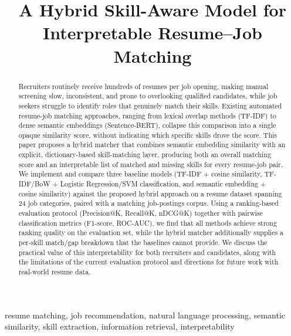 \documentclass[conference]{IEEEtran}
\begin{document}
\title{A Hybrid Skill-Aware Model for Interpretable Resume--Job Matching}

\author{
}

\maketitle

\begin{abstract}
Recruiters routinely receive hundreds of resumes per job opening, making manual screening slow, inconsistent, and prone to overlooking qualified candidates, while job seekers struggle to identify roles that genuinely match their skills. Existing automated resume-job matching approaches, ranging from lexical overlap methods (TF-IDF) to dense semantic embeddings (Sentence-BERT), collapse this comparison into a single opaque similarity score, without indicating which specific skills drove the score. This paper proposes a hybrid matcher that combines semantic embedding similarity with an explicit, dictionary-based skill-matching layer, producing both an overall matching score and an interpretable list of matched and missing skills for every resume-job pair. We implement and compare three baseline models (TF-IDF + cosine similarity, TF-IDF/BoW + Logistic Regression/SVM classification, and semantic embedding + cosine similarity) against the proposed hybrid approach on a resume dataset spanning 24 job categories, paired with a matching job-postings corpus. Using a ranking-based evaluation protocol (Precision@K, Recall@K, nDCG@K) together with pairwise classification metrics (F1-score, ROC-AUC), we find that all methods achieve strong ranking quality on the evaluation set, while the hybrid matcher additionally supplies a per-skill match/gap breakdown that the baselines cannot provide. We discuss the practical value of this interpretability for both recruiters and candidates, along with the limitations of the current evaluation protocol and directions for future work with real-world resume data.
\end{abstract}

\begin{IEEEkeywords}
resume matching, job recommendation, natural language processing, semantic similarity, skill extraction, information retrieval, interpretability
\end{IEEEkeywords}
\end{document}
